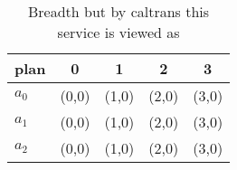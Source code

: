 \documentclass[a4paper]{article}
\begin{document}
\begin{table}
\begin{adjustbox}{width=0.6\columnwidth}
\begin{tabular}{|l|l|l|l|l|}
\hline
\textbf{plan} & \multicolumn{1}{c|}{\textbf{0}} & \multicolumn{1}{c|}{\textbf{1}} & \multicolumn{1}{c|}{\textbf{2}} & \multicolumn{1}{c|}{\textbf{3}} \\ \hline
\textbf{$a_0$}  & (0,0) & (1,0) & (2,0) & (3,0) \\ \hline
\textbf{$a_1$}  & (0,0) & (1,0) & (2,0) & (3,0) \\ \hline
\textbf{$a_2$}  & (0,0) & (1,0) & (2,0) & (3,0) \\ \hline
\end{tabular}
\end{adjustbox}
\caption{Breadth but by caltrans this service is viewed as
}
\end{table}
\end{document}
